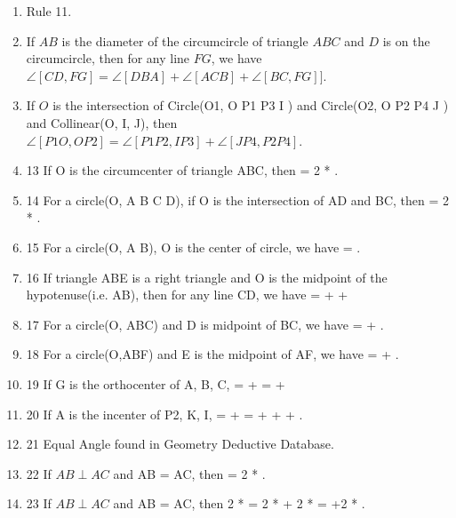 \documentclass[a4paper,11pt]{article}
\begin{document}
\begin{enumerate}
\item Rule 11.

\item If $AB$ is the diameter of the circumcircle of triangle $ABC$
  and $D$ is on the circumcircle, then for any line $FG$, we have
  $\angle[CD,FG] = \angle[DBA] + \angle[ACB] + \angle[BC, FG]]$.
  
\item If $O$ is the intersection of Circle(O1, O P1 P3 I ) and Circle(O2, O P2 P4 J ) and Collinear(O, I, J), then $\angle[P1O, OP2] = \angle[P1P2, IP3] + \angle[JP4, P2P4]$.

\item 13
 If O is the circumcenter of triangle ABC, then \angle[BOC] = 2 * \angle[BAC].

\item 14
 For a circle(O, A B C D), if O is the intersection of AD and BC, then \angle[AOB] = 2 * \angle[CDA].

\item 15
 For a circle(O, A B), O is the center of circle, we have \angle[OAB] = \angle[ABO]. 

\item 16
 If triangle ABE is a right triangle and O is the midpoint of the hypotenuse(i.e. AB), then for any line CD, we have
 \angle[AB, CD] =  \angle[BAE] + \angle[1] + \angle[BE, CD]  

\item 17
 For a circle(O, ABC) and D is midpoint of BC, we have \angle[AB, EF] = \angle[BOD] + \angle[AC,EF]. 

\item 18
 For a circle(O,ABF) and E is the midpoint of AF, we have \angle[AB, CD] = \angle[EOA] + \angle[BF, CD].

\item 19
 If G is the orthocenter of A, B, C, \angle[AE, HI] = \angle[AE, BE] + \angle[BE, HI] = \angle[1] + \angle[BE, HI]

\item 20
If A is the incenter of P2, K, I,  \angle[AB, CD] = \angle[AB, BK] + \angle[BK, CD] = \angle[1] + \angle[KI, KA] + \angle[IA, IK] + \angle[BK, CD].

\item 21
 Equal Angle found in Geometry Deductive Database.

\item  22
 If $AB \perp AC$ and AB = AC, then \angle[AB,AC] = 2 * \angle[AB,BC].

\item  23
 If $AB \perp AC$ and AB = AC, then 2 * \angle[AB,DE] = 2 * \angle[AB,BC] + 2 * \angle[BC,DE] = \angle[1] +2 * \angle[BC,DE].


\end{enumerate}
\end{document}
